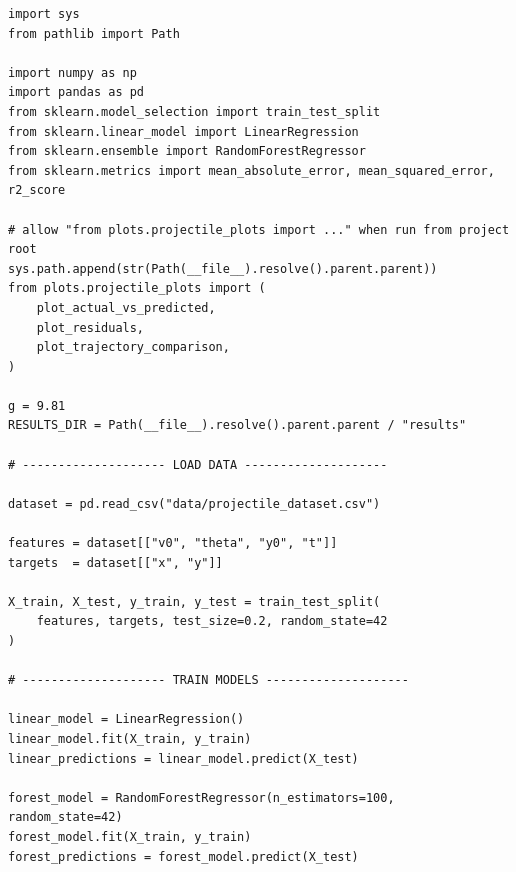 \documentclass[11pt,a4paper]{article}
\begin{document}
\begin{lstlisting}[caption={Stages 3--4 --- loading, splitting and training.}]
import sys
from pathlib import Path

import numpy as np
import pandas as pd
from sklearn.model_selection import train_test_split
from sklearn.linear_model import LinearRegression
from sklearn.ensemble import RandomForestRegressor
from sklearn.metrics import mean_absolute_error, mean_squared_error, r2_score

# allow "from plots.projectile_plots import ..." when run from project root
sys.path.append(str(Path(__file__).resolve().parent.parent))
from plots.projectile_plots import (
    plot_actual_vs_predicted,
    plot_residuals,
    plot_trajectory_comparison,
)

g = 9.81
RESULTS_DIR = Path(__file__).resolve().parent.parent / "results"

# -------------------- LOAD DATA --------------------

dataset = pd.read_csv("data/projectile_dataset.csv")

features = dataset[["v0", "theta", "y0", "t"]]
targets  = dataset[["x", "y"]]

X_train, X_test, y_train, y_test = train_test_split(
    features, targets, test_size=0.2, random_state=42
)

# -------------------- TRAIN MODELS --------------------

linear_model = LinearRegression()
linear_model.fit(X_train, y_train)
linear_predictions = linear_model.predict(X_test)

forest_model = RandomForestRegressor(n_estimators=100, random_state=42)
forest_model.fit(X_train, y_train)
forest_predictions = forest_model.predict(X_test)
\end{lstlisting}
\end{document}
